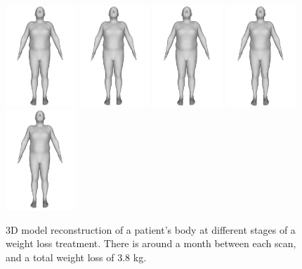 \begin{figure}
      \centering
      \includegraphics[width=75pt]{files/patient_8/2_cropped}
      \includegraphics[width=75pt]{files/patient_8/3_cropped}
      \includegraphics[width=75pt]{files/patient_8/4_cropped}
      \includegraphics[width=75pt]{files/patient_8/5_cropped}
      \includegraphics[width=75pt]{files/patient_8/6_cropped}
      \caption{3D model reconstruction of a patient's body at different stages of a weight loss
            treatment. There is around a month between each scan, and a total
            weight loss of 3.8 kg.}
\end{figure}

